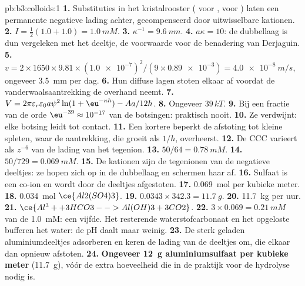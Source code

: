 \begin{solution}{pb:b3:colloids:1}
\textbf{1.} Substituties in het kristalrooster ( voor ,  voor ) laten
een permanente negatieve lading achter, gecompenseerd door uitwisselbare
kationen.
\textbf{2.} $I = \frac12(1.0 + 1.0) = \qty{1.0}{mM}$.
\textbf{3.} $\kappa^{-1} = \qty{9.6}{nm}$.
\textbf{4.} $a\kappa = 10$: de dubbellaag is dun vergeleken met het deeltje,
de voorwaarde voor de benadering van Derjaguin.
\textbf{5.} $v = 2 \times 1650 \times 9.81 \times (\num{1.0e-7})^2/(9 \times \num{0.89e-3}) = \qty{4.0e-8}{m/s}$, ongeveer \qty{3.5}{mm} per dag.
\textbf{6.} Hun diffuse lagen stoten elkaar af voordat de
vanderwaalsaantrekking de overhand neemt.
\textbf{7.} $V = 2\pi\varepsilon_r\varepsilon_0a\psi^2\ln(1 + \eu^{-\kappa h}) - Aa/12h$.
\textbf{8.} Ongeveer $39\,kT$.
\textbf{9.} Bij een fractie van de orde $\eu^{-39} \approx 10^{-17}$ van de botsingen: praktisch nooit.
\textbf{10.} Ze verdwijnt: elke botsing leidt tot contact.
\textbf{11.} Een kortere  beperkt de afstoting tot kleine
spleten, waar de
aantrekking, die groeit als $1/h$, overheerst.
\textbf{12.} De CCC varieert als $z^{-6}$ van de lading van het tegenion.
\textbf{13.} $50/64 = \qty{0.78}{mM}$.
\textbf{14.} $50/729 = \qty{0.069}{mM}$.
\textbf{15.} De kationen zijn de tegenionen van de negatieve deeltjes: ze
hopen zich op in de dubbellaag en schermen haar af.
\textbf{16.} Sulfaat is een co-ion en wordt door de deeltjes afgestoten.
\textbf{17.} \qty{0.069}{mol}  per kubieke meter.
\textbf{18.} \qty{0.034}{mol} $\ce{Al2(SO4)3}$.
\textbf{19.} $0.0343 \times 342.3 = \qty{11.7}{g}$.
\textbf{20.} \qty{11.7}{kg} per uur.
\textbf{21.} $\ce{Al^3+ + 3 HCO3- -> Al(OH)3 + 3 CO2}$.
\textbf{22.} $3 \times 0.069 = \qty{0.21}{mM}$ van de \qty{1.0}{mM}: een vijfde. Het resterende
waterstofcarbonaat en het opgeloste  bufferen het water: de pH daalt
maar weinig.
\textbf{23.} De sterk geladen aluminiumdeeltjes adsorberen en keren de
lading van de deeltjes om, die elkaar dan opnieuw afstoten.
\textbf{24.} \textbf{Ongeveer \qty{12}{g} aluminiumsulfaat per kubieke meter} (\qty{11.7}{g}), vóór de extra
hoeveelheid die in de praktijk voor de hydrolyse nodig is.
\end{solution}
